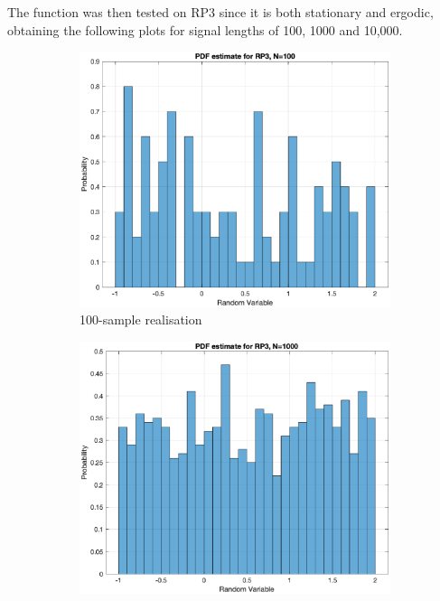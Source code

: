 \noindent
The function was then tested on RP3 since it is both stationary and ergodic, obtaining the following plots for signal lengths of 100, 1000 and 10,000.
\begin{figure}[H]
\begin{subfigure}{.32\textwidth}
  \centering
  \includegraphics[width=\linewidth]{assignment1figs/rp3100}  
  \caption{100-sample realisation}
\end{subfigure}
\begin{subfigure}{.32\textwidth}
  \centering
  \includegraphics[width=\linewidth]{assignment1figs/rp31000.eps}  

\end{subfigure}
\end{figure}
